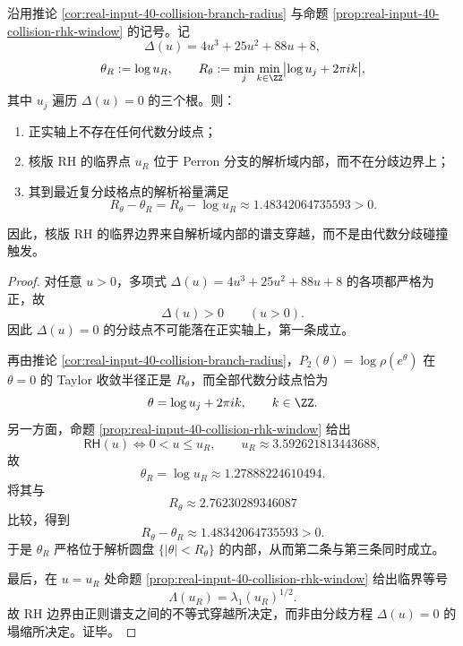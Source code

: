 \begin{theorem}[核版 RH 的临界边界是解析谱相变而非分歧碰撞]\label{thm:xi-time-part9pb-rh-transition-analytic-not-branch}
沿用推论 \ref{cor:real-input-40-collision-branch-radius} 与命题
\ref{prop:real-input-40-collision-rhk-window} 的记号。记
\[
\Delta(u)=4u^3+25u^2+88u+8,
\]
\[
\theta_R:=\log u_R,
\qquad
R_\theta:=\min_j\min_{k\in\ZZ}\bigl|\log u_j+2\pi i k\bigr|,
\]
其中 \(u_j\) 遍历 \(\Delta(u)=0\) 的三个根。则：
\begin{enumerate}
  \item 正实轴上不存在任何代数分歧点；
  \item 核版 RH 的临界点 \(u_R\) 位于 Perron 分支的解析域内部，而不在分歧边界上；
  \item 其到最近复分歧格点的解析裕量满足
  \[
  \boxed{\ R_\theta-\theta_R
  =
  R_\theta-\log u_R
  \approx 1.48342064735593>0.\ }
  \]
\end{enumerate}
因此，核版 RH 的临界边界来自解析域内部的谱支穿越，而不是由代数分歧碰撞触发。
\end{theorem}
\begin{proof}
对任意 \(u>0\)，多项式 \(\Delta(u)=4u^3+25u^2+88u+8\) 的各项都严格为正，故
\[
\Delta(u)>0\qquad (u>0).
\]
因此 \(\Delta(u)=0\) 的分歧点不可能落在正实轴上，第一条成立。

再由推论 \ref{cor:real-input-40-collision-branch-radius}，\(P_2(\theta)=\log\rho(e^\theta)\) 在 \(\theta=0\) 的 Taylor 收敛半径正是 \(R_\theta\)，而全部代数分歧点恰为
\[
\theta=\log u_j+2\pi i k,\qquad k\in\ZZ.
\]
另一方面，命题 \ref{prop:real-input-40-collision-rhk-window} 给出
\[
\textsf{RH}(u)\Longleftrightarrow 0<u\le u_R,
\qquad
u_R\approx 3.592621813443688,
\]
故
\[
\theta_R=\log u_R\approx 1.27888224610494.
\]
将其与
\[
R_\theta\approx 2.76230289346087
\]
比较，得到
\[
R_\theta-\theta_R\approx 1.48342064735593>0.
\]
于是 \(\theta_R\) 严格位于解析圆盘 \(\{|\theta|<R_\theta\}\) 的内部，从而第二条与第三条同时成立。

最后，在 \(u=u_R\) 处命题 \ref{prop:real-input-40-collision-rhk-window} 给出临界等号
\[
\Lambda(u_R)=\lambda_1(u_R)^{1/2}.
\]
故 RH 边界由正则谱支之间的不等式穿越所决定，而非由分歧方程 \(\Delta(u)=0\) 的塌缩所决定。证毕。
\end{proof}

